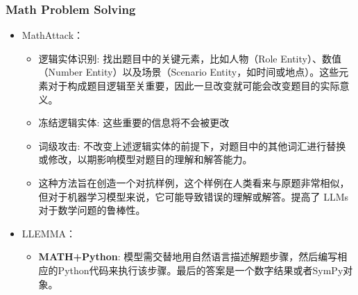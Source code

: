 \begin{frame}
	\frametitle{Math Problem Solving}
	\begin{itemize}
		\item MathAttack：
		      \begin{itemize}
			      \item 逻辑实体识别: 找出题目中的关键元素，比如人物（Role Entity）、数值（Number Entity）以及场景（Scenario Entity，如时间或地点）。这些元素对于构成题目逻辑至关重要，因此一旦改变就可能会改变题目的实际意义。
			      \item 冻结逻辑实体: 这些重要的信息将不会被更改
			      \item 词级攻击: 不改变上述逻辑实体的前提下，对题目中的其他词汇进行替换或修改，以期影响模型对题目的理解和解答能力。
			      \item 这种方法旨在创造一个对抗样例，这个样例在人类看来与原题非常相似，但对于机器学习模型来说，它可能导致错误的理解或解答。提高了 LLMs 对于数学问题的鲁棒性。
		      \end{itemize}
		      \pause
		\item LLEMMA：
		      \begin{itemize}
			      \item \textbf{MATH+Python}: 模型需交替地用自然语言描述解题步骤，然后编写相应的Python代码来执行该步骤。最后的答案是一个数字结果或者SymPy对象。
		      \end{itemize}
	\end{itemize}
\end{frame}


